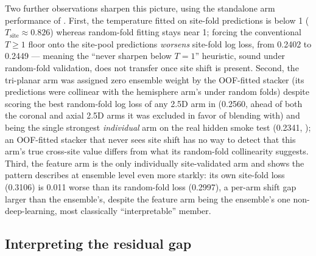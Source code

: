\documentclass[10pt]{article}
\begin{document}
Two further observations sharpen this picture, using the standalone arm performance of . First, the temperature fitted on site-fold predictions is below 1 ($T_{\text{site}} \approx 0.826$) whereas random-fold fitting stays near 1; forcing the conventional $T \geq 1$ floor onto the site-pool predictions \emph{worsens} site-fold log loss, from 0.2402 to 0.2449 --- meaning the ``never sharpen below $T=1$'' heuristic, sound under random-fold validation, does not transfer once site shift is present. Second, the tri-planar arm was assigned zero ensemble weight by the OOF-fitted stacker (its predictions were collinear with the hemisphere arm's under random folds) despite scoring the best random-fold log loss of any 2.5D arm in  (0.2560, ahead of both the coronal and axial 2.5D arms it was excluded in favor of blending with) and being the single strongest \emph{individual} arm on the real hidden smoke test (0.2341, ); an OOF-fitted stacker that never sees site shift has no way to detect that this arm's true cross-site value differs from what its random-fold collinearity suggests. Third, the feature arm is the only individually site-validated arm and shows the pattern  describes at ensemble level even more starkly: its own site-fold loss (0.3106) is 0.011 worse than its random-fold loss (0.2997), a per-arm shift gap larger than the ensemble's, despite the feature arm being the ensemble's one non-deep-learning, most classically ``interpretable'' member.

\subsection{Interpreting the residual gap}
\end{document}

